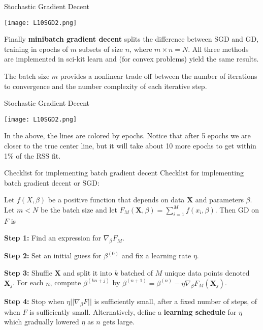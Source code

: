 \documentclass[10pt, table, dvipsnames,xcdraw, handout]{beamer}
\begin{document}
\begin{frame}[fragile]{Stochastic Gradient Decent}
  \begin{minipage}[t][0.5\textheight][t]{\textwidth}
	\centering \texttt{[image: L10SGD2.png]} 
  \end{minipage}
  \vfill
\begin{minipage}[t][0.5\textheight][t]{\textwidth}
Finally \textbf{minibatch gradient decent} splits the difference between SGD and GD, training in epochs of $m$ subsets of size $n$, where $m\times n = N$. All three methods are implemented in sci-kit learn and (for convex problems) yield the same results. \pause

The batch size $m$ provides a nonlinear trade off between the number of iterations to convergence and the number complexity of each iterative step. 
\end{minipage}
\end{frame}



\begin{frame}[fragile]{Stochastic Gradient Decent}
  \begin{minipage}[t][0.5\textheight][t]{\textwidth}
	\centering \texttt{[image: L10SGD2.png]} 
  \end{minipage}
  \vfill
\begin{minipage}[t][0.5\textheight][t]{\textwidth}
In the above, the lines are colored by epochs. Notice that after 5 epochs we are closer to the true center line, but it will take about 10 more epochs to get within 1\% of the RSS fit.  
\end{minipage}
\end{frame}



\begin{frame}[fragile]{Checklist for implementing batch gradient decent}
Checklist for implementing batch gradient decent or SGD:

Let $f(X, \beta)$ be a positive function that depends on data $\mathbf{X}$ and parameters $\beta$. Let $m<N$ be the batch size and let $F_M(\mathbf{X},\beta) = \sum_{i=1}^M f(x_i, \beta)$. Then GD on $F$ is

\textbf{Step 1:} Find an expression for $\nabla_\beta F_M$. 

\textbf{Step 2:} Set an initial guess for $\beta^{(0)}$ and fix a learning rate $\eta$. 

\textbf{Step 3:} Shuffle $\mathbf{X}$ and split it into $k$ batched of $M$ unique data points denoted $\mathbf{X}_j$. For each $n$, compute $\beta^{(k n+j)}$ by $\beta^{(n+1)} = \beta^{(n)} - \eta \nabla_\beta F_M(\mathbf{X}_j)$.

\textbf{Step 4:} Stop when $\eta ||\nabla_\beta F||$ is sufficiently small, after a fixed number of steps, of when $F$ is sufficiently small. Alternatively, define a \textbf{learning schedule} for $\eta$ which gradually lowered $\eta$ as $n$ gets large. 
\end{frame}
\end{document}
